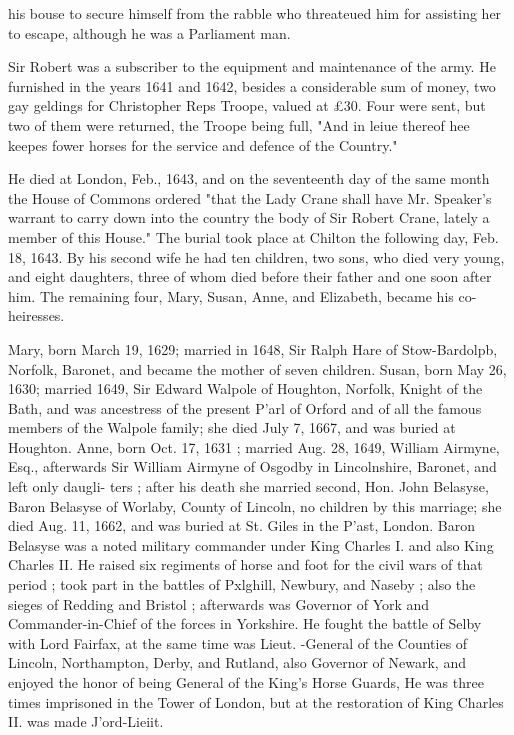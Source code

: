 \documentclass{book}
\begin{document}
his bouse to secure himself from the rabble who threateued him 
for assisting her to escape, although he was a Parliament man. 

Sir Robert was a subscriber to the equipment and maintenance 
of the army. He furnished in the years 1641 and 1642, besides 
a considerable sum of money, two gay geldings for Christopher 
Reps Troope, valued at £30. Four were sent, but two of them 
were returned, the Troope being full, "And in leiue thereof hee 
keepes fower horses for the service and defence of the Country." 

He died at London, Feb., 1643, and on the seventeenth day of 
the same month the House of Commons ordered "that the Lady 
Crane shall have Mr. Speaker's warrant to carry down into the 
country the body of Sir Robert Crane, lately a member of this 
House." The burial took place at Chilton the following day, 
Feb. 18, 1643. By his second wife he had ten children, two 
sons, who died very young, and eight daughters, three of whom 
died before their father and one soon after him. The remaining 
four, Mary, Susan, Anne, and Elizabeth, became his co-heiresses. 

Mary, born March 19, 1629; married in 1648, Sir Ralph Hare 
of Stow-Bardolpb, Norfolk, Baronet, and became the mother of 
seven children. Susan, born May 26, 1630; married 1649, Sir 
Edward Walpole of Houghton, Norfolk, Knight of the Bath, and 
was ancestress of the present P'arl of Orford and of all the famous 
members of the Walpole family; she died July 7, 1667, and 
was buried at Houghton. Anne, born Oct. 17, 1631 ; married 
Aug. 28, 1649, William Airmyne, Esq., afterwards Sir William 
Airmyne of Osgodby in Lincolnshire, Baronet, and left only daugli- 
ters ; after his death she married second, Hon. John Belasyse, 
Baron Belasyse of Worlaby, County of Lincoln, no children by 
this marriage; she died Aug. 11, 1662, and was buried at St. 
Giles in the P'ast, London. Baron Belasyse was a noted military 
commander under King Charles I. and also King Charles II. 
He raised six regiments of horse and foot for the civil wars of 
that period ; took part in the battles of Pxlghill, Newbury, and 
Naseby ; also the sieges of Redding and Bristol ; afterwards was 
Governor of York and Commander-in-Chief of the forces in 
Yorkshire. He fought the battle of Selby with Lord Fairfax, at 
the same time was Lieut. -General of the Counties of Lincoln, 
Northampton, Derby, and Rutland, also Governor of Newark, 
and enjoyed the honor of being General of the King's Horse 
Guards, He was three times imprisoned in the Tower of London, 
but at the restoration of King Charles II. was made J'ord-Lieiit. 
\end{document}

